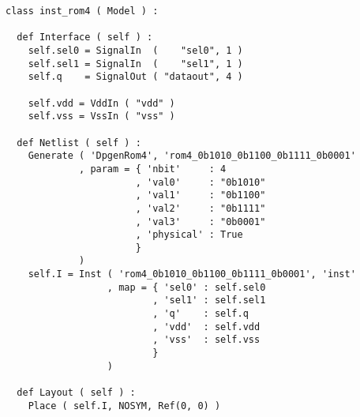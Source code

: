 \begin{itemize}
\begin{verbatim}
class inst_rom4 ( Model ) :

  def Interface ( self ) :
    self.sel0 = SignalIn  (    "sel0", 1 )
    self.sel1 = SignalIn  (    "sel1", 1 )
    self.q    = SignalOut ( "dataout", 4 )
    
    self.vdd = VddIn ( "vdd" )
    self.vss = VssIn ( "vss" )
    
  def Netlist ( self ) :
    Generate ( 'DpgenRom4', 'rom4_0b1010_0b1100_0b1111_0b0001'
             , param = { 'nbit'     : 4
                       , 'val0'     : "0b1010"
                       , 'val1'     : "0b1100"
                       , 'val2'     : "0b1111"
                       , 'val3'     : "0b0001"
                       , 'physical' : True
                       }
             )      
    self.I = Inst ( 'rom4_0b1010_0b1100_0b1111_0b0001', 'inst'
                  , map = { 'sel0' : self.sel0
                          , 'sel1' : self.sel1
                          , 'q'    : self.q
                          , 'vdd'  : self.vdd
                          , 'vss'  : self.vss
                          }
                  )
  
  def Layout ( self ) :
    Place ( self.I, NOSYM, Ref(0, 0) )
\end{verbatim}
\end{itemize}
